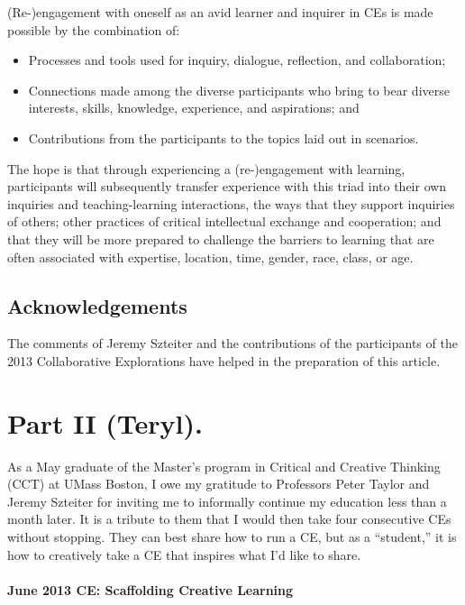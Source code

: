 \mbox{(Re-)}engagement with oneself as an avid learner and inquirer in CEs is
made possible by the combination of:

\begin{itemize}
\itemsep1pt\parskip0pt
\item
  Processes and tools used for inquiry, dialogue, reflection, and
  collaboration;
\item
  Connections made among the diverse participants who bring to bear
  diverse interests, skills, knowledge, experience, and aspirations; and
\item
  Contributions from the participants to the topics laid out in scenarios.
\end{itemize}

\noindent The hope is that through experiencing a \mbox{(re-)}engagement with learning,
participants will subsequently transfer experience with this triad
into their own inquiries and teaching-learning interactions, the ways
that they support inquiries of others; other practices of critical
intellectual exchange and cooperation; and that they will be more
prepared to challenge the barriers to learning that are often
associated with expertise, location, time, gender, race, class, or
age.

\subsection{Acknowledgements}

The comments of Jeremy Szteiter and the contributions of the
participants of the 2013 Collaborative Explorations have helped in the
preparation of this article.

\section*{Part II (Teryl).}

As a May graduate of the Master's program in
Critical and Creative Thinking (CCT) at UMass Boston, I owe my gratitude
to Professors Peter Taylor and Jeremy Szteiter for inviting me to
informally continue my education less than a month later. It is a
tribute to them that I would then take four consecutive CEs without
stopping. They can best share how to run a CE, but as a ``student,'' it
is how to creatively take a CE that inspires what I'd like to share.

\paragraph{June 2013 CE: Scaffolding Creative Learning}

